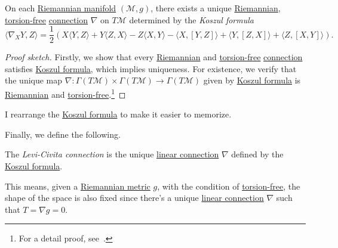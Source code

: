 \begin{theorem}\label{thm:Levi-Civita}
	On each \hyperref[def:Riemannian-manifold]{Riemannian manifold} \((\mathcal{M} , g)\), there exists a unique \hyperref[def:Riemannian]{Riemannian}, \hyperref[def:torsion-free]{torsion-free} \hyperref[def:linear-connection]{connection} \(\nabla \) on \(T\mathcal{M} \) determined by the \emph{Koszul formula}
	\begin{equation}\label{eq:Koszul-formula}
		\langle \nabla _X Y, Z \rangle
		= \frac{1}{2} (
		X \langle Y, Z \rangle
		+ Y\langle Z, X \rangle
		- Z\langle X, Y \rangle
		- \langle X, [Y, Z] \rangle
		+ \langle Y, [Z, X] \rangle
		+ \langle Z, [X, Y] \rangle ).
	\end{equation}
\end{theorem}
\begin{proof}[Proof sketch]
	Firstly, we show that every \hyperref[def:Riemannian]{Riemannian} and \hyperref[def:torsion-free]{torsion-free} \hyperref[def:linear-connection]{connection} satisfies \hyperref[eq:Koszul-formula]{Koszul formula}, which implies uniqueness. For existence, we verify that the unique map \(\nabla \colon \Gamma (T \mathcal{M} ) \times \Gamma (T \mathcal{M} )\to \Gamma (T\mathcal{M} )\) given by \hyperref[eq:Koszul-formula]{Koszul formula} is \hyperref[def:Riemannian]{Riemannian} and \hyperref[def:torsion-free]{torsion-free}.\footnote{For a detail proof, see~\cite[ Theorem 3.6]{flaherty2013riemannian}.}
\end{proof}

\begin{note}
	I rearrange the \hyperref[eq:Koszul-formula]{Koszul formula} to make it easier to memorize.
\end{note}

Finally, we define the following.

\begin{definition}\label{def:Levi-Civita-connection}
	The \emph{Levi-Civita connection} is the unique \hyperref[def:linear-connection]{linear connection} \(\nabla \) defined by the \hyperref[eq:Koszul-formula]{Koszul formula}.
\end{definition}


\begin{remark}
	This means, given a \hyperref[def:Riemannian-metric]{Riemannian metric} \(g\), with the condition of \hyperref[def:torsion-free]{torsion-free}, the shape of the space is also fixed since there's a unique \hyperref[def:linear-connection]{linear connection} \(\nabla \) such that \(T = \nabla g = 0\).
\end{remark}